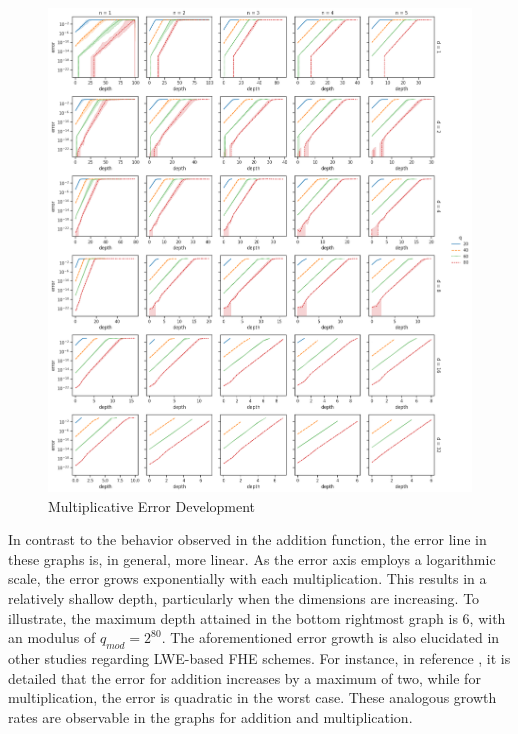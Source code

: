 \begin{figure}[htp]
  \centering
  \includegraphics[scale=0.38]{images/MulErrorDevelopment.png}
  \caption[Multiplicative Error Development]{Multiplicative Error Development}
  \label{fig:MulErrorDev}
\end{figure}

In contrast to the behavior observed in the addition function, the error line in these graphs is, in general, more linear. As the error axis employs a logarithmic scale, the error grows exponentially with each multiplication. This results in a relatively shallow depth, particularly when the dimensions are increasing. To illustrate, the maximum depth attained in the bottom rightmost graph is $6$, with an modulus of $q_{mod} = 2^{80}$. The aforementioned error growth is also elucidated in other studies regarding LWE-based FHE schemes. For instance, in reference \cite{FHEwoBottstrapping}, it is detailed that the error for addition increases by a maximum of two, while for multiplication, the error is quadratic in the worst case. These analogous growth rates are observable in the graphs for addition and multiplication.

